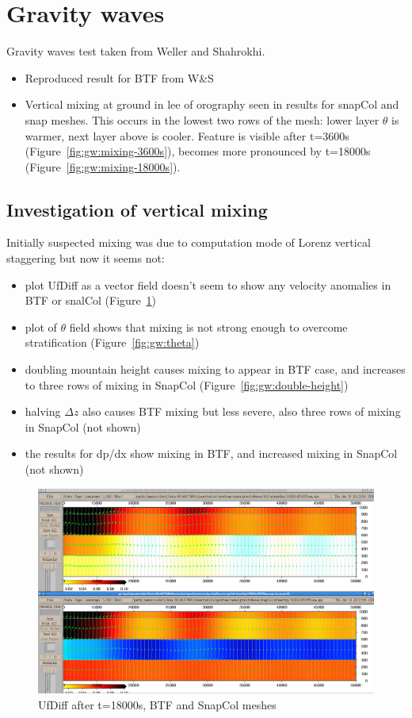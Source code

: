 \section{Gravity waves}

Gravity waves test taken from Weller and Shahrokhi.

\begin{itemize}
\item Reproduced result for BTF from W\&S
\item Vertical mixing at ground in lee of orography seen in results for snapCol and snap meshes.  This occurs in the lowest two rows of the mesh: lower layer $\theta$ is warmer, next layer above is cooler.  Feature is visible after t=3600s (Figure~\ref{fig:gw:mixing-3600s}), becomes more pronounced by t=18000s (Figure~\ref{fig:gw:mixing-18000s}).
\end{itemize}

\subsection{Investigation of vertical mixing}
Initially suspected mixing was due to computation mode of Lorenz vertical staggering but now it seems not:
\begin{itemize}
	\item plot UfDiff as a vector field doesn't seem to show any velocity anomalies in BTF or snalCol (Figure~\ref{fig:gw:ufdiff})
	\item plot of $\theta$ field shows that mixing is not strong enough to overcome stratification (Figure~\ref{fig:gw:theta})
	\item doubling mountain height causes mixing to appear in BTF case, and increases to three rows of mixing in SnapCol (Figure~\ref{fig:gw:double-height})
	\item halving $\Delta z$ also causes BTF mixing but less severe, also three rows of mixing in SnapCol (not shown)
	\item the results for dp/dx show mixing in BTF, and increased mixing in SnapCol (not shown)
\end{itemize}

\begin{figure}
	\includegraphics[width=\textwidth]{interim-results/gravityWavesBTFSnapColVelocityVectors.png}
	\caption{UfDiff after t=18000s, BTF and SnapCol meshes}
	\label{fig:gw:ufdiff}
\end{figure}

